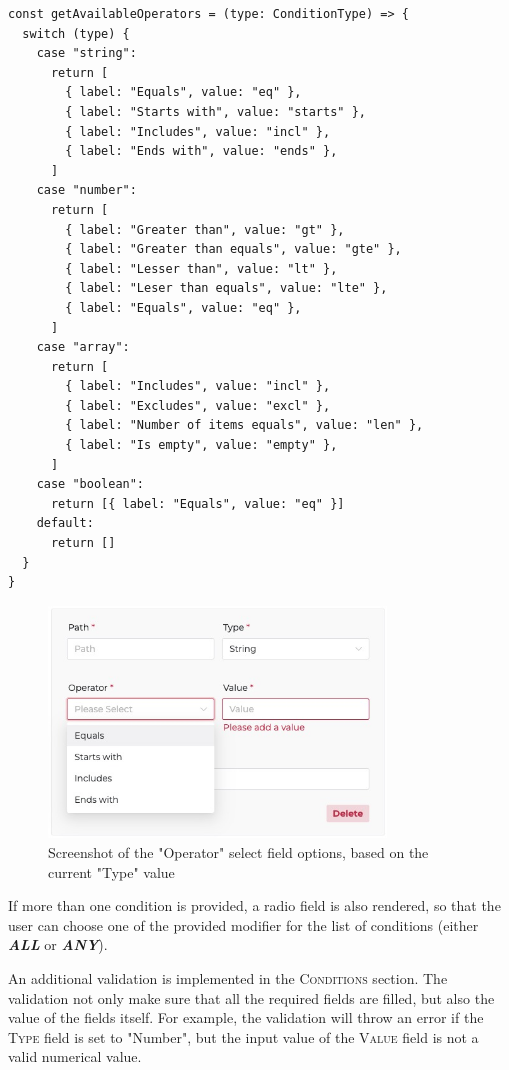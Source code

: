       \begin{lstlisting}[style=es6, caption={Function to get list of available operators based on a condition's type attribute (TypeScript)}]
const getAvailableOperators = (type: ConditionType) => {
  switch (type) {
    case "string":
      return [
        { label: "Equals", value: "eq" },
        { label: "Starts with", value: "starts" },
        { label: "Includes", value: "incl" },
        { label: "Ends with", value: "ends" },
      ]
    case "number":
      return [
        { label: "Greater than", value: "gt" },
        { label: "Greater than equals", value: "gte" },
        { label: "Lesser than", value: "lt" },
        { label: "Leser than equals", value: "lte" },
        { label: "Equals", value: "eq" },
      ]
    case "array":
      return [
        { label: "Includes", value: "incl" },
        { label: "Excludes", value: "excl" },
        { label: "Number of items equals", value: "len" },
        { label: "Is empty", value: "empty" },
      ]
    case "boolean":
      return [{ label: "Equals", value: "eq" }]
    default:
      return []
  }
}
      \end{lstlisting}

      \begin{figure}[!ht]
        \centering
        \includegraphics[width=0.8\textwidth]{images/ss_condition_op.jpeg}
        \caption{Screenshot of the "Operator" select field options, based on the current "Type" value}
      \end{figure}
      
      If more than one condition is provided, a radio field is also rendered, so that the user can choose one of the provided modifier for the list of conditions (either \textbf{\emph{ALL}} or \textbf{\emph{ANY}}). 

      An additional validation is implemented in the \textsc{Conditions} section. The validation not only make sure that all the required fields are filled, but also the value of the fields itself. For example, the validation will throw an error if the \textsc{Type} field is set to "Number", but the input value of the \textsc{Value} field is not a valid numerical value. 

